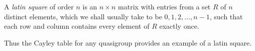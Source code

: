 A \emph{latin square} of order $n$ is an $n \times n$ matrix with entries from a set $R$ of $n$ distinct elements, which we shall usually take to be $0, 1, 2, \dots, n-1$, such that each row and column contains every element of $R$ exactly once.

Thus the Cayley table for any quasigroup provides an example of a latin square.
